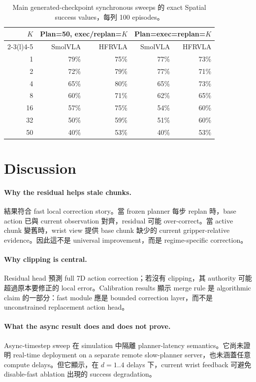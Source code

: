 \documentclass[10pt]{article}
\newcommand{\method}{HFRVLA}
\newcommand{\smolvla}{SmolVLA}
\begin{document}
\begin{table}[t]
  \centering
  \caption{Main generated-checkpoint synchronous sweeps 的 exact Spatial success values，每列 100 episodes。}
  \begin{tabular}{@{}rrrrr@{}}
    \toprule
    $K$ & \multicolumn{2}{c}{Plan=50, exec/replan=$K$} & \multicolumn{2}{c}{Plan=exec=replan=$K$} \\
    \cmidrule(lr){2-3}\cmidrule(l){4-5}
    & \smolvla{} & \method{} & \smolvla{} & \method{} \\
    \midrule
    1  & 79\% & 75\% & 77\% & 73\% \\
    2  & 72\% & 79\% & 77\% & 71\% \\
    4  & 65\% & 80\% & 65\% & 73\% \\
    8  & 60\% & 71\% & 62\% & 65\% \\
    16 & 57\% & 75\% & 54\% & 60\% \\
    32 & 50\% & 59\% & 51\% & 60\% \\
    50 & 40\% & 53\% & 40\% & 53\% \\
    \bottomrule
  \end{tabular}
  \label{tab:exact-values-zh}
\end{table}

\section{Discussion}

\paragraph{Why the residual helps stale chunks.}
結果符合 fast local correction story。當 frozen planner 每步 replan 時，base action 已與 current observation 對齊，residual 可能 over-correct。當 active chunk 變舊時，wrist view 提供 base chunk 缺少的 current gripper-relative evidence。因此這不是 universal improvement，而是 regime-specific correction。

\paragraph{Why clipping is central.}
Residual head 預測 full 7D action correction；若沒有 clipping，其 authority 可能超過原本要修正的 local error。Calibration results 顯示 merge rule 是 algorithmic claim 的一部分：fast module 應是 bounded correction layer，而不是 unconstrained replacement action head。

\paragraph{What the async result does and does not prove.}
Async-timestep sweep 在 simulation 中隔離 planner-latency semantics。它尚未證明 real-time deployment on a separate remote slow-planner server，也未涵蓋任意 compute delays。但它顯示，在 $d=1..4$ delays 下，current wrist feedback 可避免 disable-fast ablation 出現的 success degradation。
\end{document}
